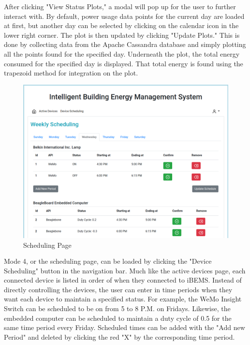 After clicking "View Status Plots," a modal will pop up for the user to further
interact with. By default, power usage data points for the current day are
loaded at first, but another day can be selected by clicking on the calendar
icon in the lower right corner. The plot is then updated by clicking "Update
Plots." This is done by collecting data from the Apache Cassandra database and
simply plotting all the points found for the specified day. Underneath the plot,
the total energy consumed for the specified day is displayed. That total energy
is found using the trapezoid method for integration on the plot. %
%
\begin{figure}
    \centering
    \includegraphics[scale=0.35]{figs/Applications_screen.png}
    \caption{Scheduling Page}
    \label{fig:schedulingl}
\end{figure}
%

Mode 4, or the scheduling page, can be loaded by clicking the "Device
Scheduling" button in the navigation bar. Much like the active devices page,
each connected device is listed in order of when they connected to iBEMS.
Instead of directly controlling the devices, the user can enter in time periods
when they want each device to maintain a specified status. For example, the WeMo
Insight Switch can be scheduled to be on from 5 to 8 P.M. on Fridays. Likewise,
the embedded computer can be scheduled to maintain a duty cycle of 0.5 for the
same time period every Friday. Scheduled times can be added with the "Add new
Period" and deleted by clicking the red "X" by the corresponding time period.

